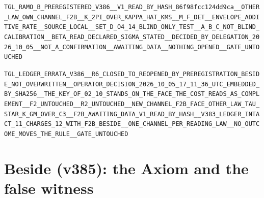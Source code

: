 \documentclass[11pt]{article}
\theoremstyle{definition}\newtheorem{deriv}{Derivation}
\begin{document}
\begin{center}\small\texttt{TGL\_RAMO\_B\_PREREGISTERED\_V386\_\_V1\_READ\_BY\_HASH\_86f98fcc124dd9ca\_\_OTHER\_LAW\_OWN\_CHANNEL\_F2B\_\_K\_2PI\_OVER\_KAPPA\_HAT\_KMS\_\_M\_F\_DET\_\_ENVELOPE\_ADDITIVE\_RATE\_\_SOURCE\_LOCAL\_\_SET\_D\_O4\_14\_BLIND\_ONLY\_TEST\_\_A\_B\_C\_NOT\_BLIND\_CALIBRATION\_\_BETA\_READ\_DECLARED\_SIGMA\_STATED\_\_DECIDED\_BY\_DELEGATION\_2026\_10\_05\_\_NOT\_A\_CONFIRMATION\_\_AWAITING\_DATA\_\_NOTHING\_OPENED\_\_GATE\_UNTOUCHED}\end{center}

\begin{center}\small\texttt{TGL\_LEDGER\_ERRATA\_V386\_\_R6\_CLOSED\_TO\_REOPENED\_BY\_PREREGISTRATION\_BESIDE\_NOT\_OVERWRITTEN\_\_OPERATOR\_DECISION\_2026\_10\_05\_17\_11\_36\_UTC\_EMBEDDED\_BY\_SHA256\_\_THE\_KEY\_OF\_02\_10\_STANDS\_ON\_THE\_FACE\_THE\_COST\_READS\_AS\_COMPLEMENT\_\_F2\_UNTOUCHED\_\_R2\_UNTOUCHED\_\_NEW\_CHANNEL\_F2B\_FACE\_OTHER\_LAW\_TAU\_STAR\_K\_GM\_OVER\_C3\_\_F2B\_AWAITING\_DATA\_V1\_READ\_BY\_HASH\_\_V383\_LEDGER\_INTACT\_11\_CHARGES\_12\_WITH\_F2B\_BESIDE\_\_ONE\_CHANNEL\_PER\_READING\_LAW\_\_NO\_OUTCOME\_MOVES\_THE\_RULE\_\_GATE\_UNTOUCHED}\end{center}

\section*{Beside (v385): the Axiom and the false witness}

\end{document}
